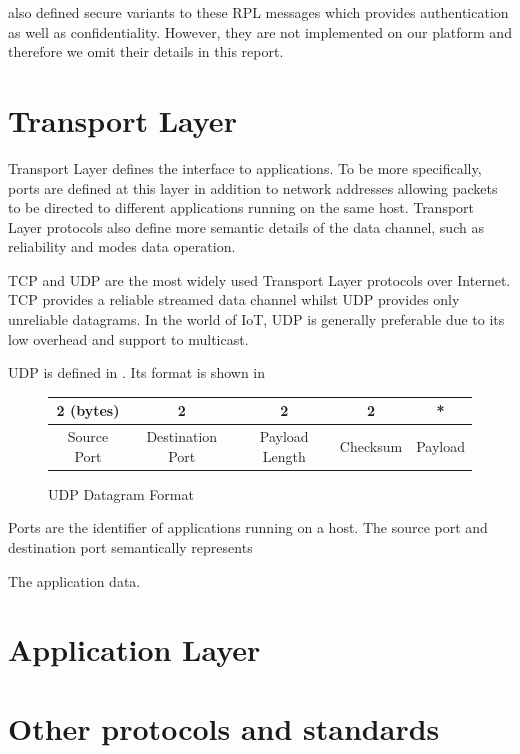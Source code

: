 \cite{rfc6550} also defined secure variants to these RPL messages which provides authentication as well as confidentiality. However, they are not implemented on our platform and therefore we omit their details in this report.

\section{Transport Layer} \label{Sec: Transportation Layer}
Transport Layer defines the interface to applications. To be more specifically, ports are defined at this layer in addition to network addresses allowing packets to be directed to different applications running on the same host. Transport Layer protocols also define more semantic details of the data channel, such as reliability and modes data operation.

TCP and UDP are the most widely used Transport Layer protocols over Internet. TCP provides a reliable streamed data channel whilst UDP provides only unreliable datagrams. In the world of IoT, UDP is generally preferable due to its low overhead and support to multicast.

UDP is defined in \cite{rfc768}. Its format is shown in 
\begin{figure}[h!]
	\center
	\begin{tabular}{|c|c|c|c|c|}
	\hline
	2 (bytes)   & 2                & 2              & 2        & *       \\ \hline
	Source Port & Destination Port & Payload Length & Checksum & Payload \\ \hline
	\end{tabular}
	\caption{UDP Datagram Format}
\label{Fig: UDP Datagram Format}
\end{figure}

\begin{description}[style=nextline]
\item[\textbf{Source and Destination Port}]
Ports are the identifier of applications running on a host. The source port and destination port semantically represents 
\item[\textbf{Payload Length}]
\item[\textbf{Checksum}]
\item[\textbf{Payload}]
The application data.
\end{description}

\section{Application Layer}

\section{Other protocols and standards}
